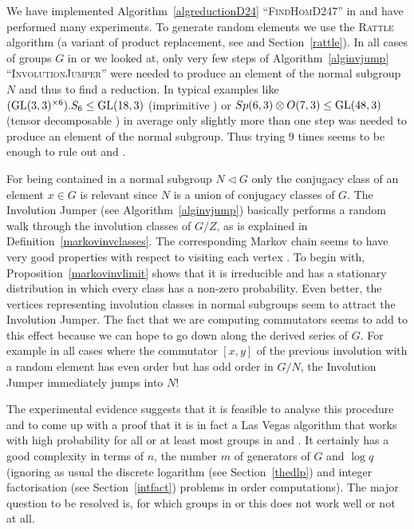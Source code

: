 \begin{Obs}
%
We have implemented Algorithm~\ref{algreductionD24}
``\textsc{FindHomD247}'' in {\GAP} and have
performed many experiments. To generate random elements we use the
\textsc{Rattle} algorithm (a variant of product replacement, see
%
\cite{LGMurray, LGO97} and Section~\ref{rattle}). 
In all cases of groups $G$ in  or  we
looked at, only very few steps of Algorithm~\ref{alginvjump}
``\textsc{InvolutionJumper}'' were needed to produce an element of the
normal subgroup $N$ and thus to find a reduction. In typical examples
like $(\GL(3,3)^{\times 6}).S_6 \le \GL(18,3)$ (imprimitive ) or $Sp(6,3)
\otimes O(7,3) \le \GL(48,3)$ (tensor decomposable ) 
in average only slightly more than one
step was needed to produce an element of the normal subgroup. Thus trying
$9$ times seems to be enough to rule out  and .
\end{Obs}

\begin{Expl}
%
For being contained in a normal subgroup $N \triangleleft G$ only the
conjugacy class of an element $x \in G$ is relevant since $N$ is a union of
conjugacy classes of $G$. The Involution Jumper (see Algorithm~\ref{alginvjump}) 
basically performs a random walk through the involution classes of $G/Z$,
as is explained in Definition~\ref{markovinvclasses}. 
The corresponding Markov chain seems to have very good properties with
respect to visiting each vertex . 
To begin with, Proposition~\ref{markovinvlimit} shows that it is irreducible
and has a stationary distribution in which every class has a non-zero 
probability. Even better, the vertices representing
involution classes in normal subgroups seem to attract the Involution
Jumper. The fact that we are computing commutators seems to add to this
effect because we can hope to go down along the derived series of $G$.
For example in all cases where the commutator $[x,y]$ of the previous
involution with a random element has even order but has odd order in
$G/N$, the Involution Jumper immediately jumps into $N$!

The experimental evidence suggests that it is feasible to analyse this
procedure and to come up with a proof that it is in fact a Las Vegas
algorithm that works with high probability for all or at least most groups
in  and . It certainly has a good complexity in terms of $n$, the
number $m$ of generators of $G$ and $\log q$ (ignoring as usual the
discrete logarithm (see Section~\ref{thedlp}) and integer factorisation 
(see Section~\ref{intfact}) problems in order computations). 
The major question to be
resolved is, for which groups in  or  this
does not work well or not at all.
\end{Expl}

